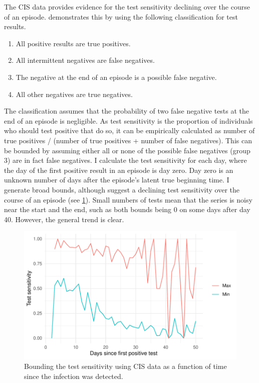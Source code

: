 \documentclass[thesis.tex]{subfiles}
\begin{document}
The CIS data provides evidence for the test sensitivity declining over the course of an episode.
 demonstrates this by using the following classification for test results.
\begin{enumerate}
    \item All positive results are true positives.
    \item All intermittent negatives are false negatives.
    \item The negative at the end of an episode is a possible false negative.
    \item All other negatives are true negatives.
\end{enumerate}
The classification assumes that the probability of two false negative tests at the end of an episode is negligible.
As test sensitivity is the proportion of individuals who should test positive that do so, it can be empirically calculated as number of true positives / (number of true positives + number of false negatives).
This can be bounded by assuming either all or none of the possible false negatives (group 3) are in fact false negatives.
I calculate the test sensitivity for each day, where the day of the first positive result in an episode is day zero.
Day zero is an unknown number of days after the episode's latent true beginning time.
I generate broad bounds, although suggest a declining test sensitivity over the course of an episode (see \cref{imperf-test:fig:bounding-cis-sensitivity}).
Small numbers of tests mean that the series is noisy near the start and the end, such as both bounds being 0 on some days after day 40.
However, the general trend is clear.
\begin{figure}
  \includegraphics{cis-imperfect-testing/test-sens-bound}
  \caption[Bounding test sensitivity using CIS data]{
    Bounding the test sensitivity using CIS data as a function of time since the infection was detected.
  }
  \label{imperf-test:fig:bounding-cis-sensitivity}
\end{figure}
\end{document}
